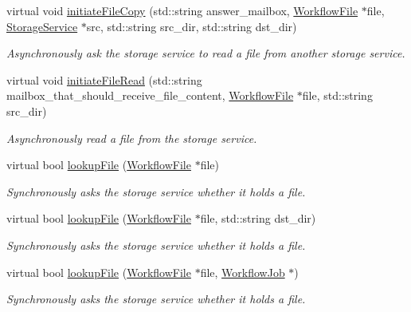 \begin{DoxyCompactItemize}
virtual void \hyperlink{classwrench_1_1_storage_service_a09b05865c81f22295720776e5952ffd4}{initiate\+File\+Copy} (std\+::string answer\+\_\+mailbox, \hyperlink{classwrench_1_1_workflow_file}{Workflow\+File} $\ast$file, \hyperlink{classwrench_1_1_storage_service}{Storage\+Service} $\ast$src, std\+::string src\+\_\+dir, std\+::string dst\+\_\+dir)
\begin{DoxyCompactList}\small\item\em Asynchronously ask the storage service to read a file from another storage service. \end{DoxyCompactList}\item 
virtual void \hyperlink{classwrench_1_1_storage_service_a36f64413afa694b425cf5caad85b4c81}{initiate\+File\+Read} (std\+::string mailbox\+\_\+that\+\_\+should\+\_\+receive\+\_\+file\+\_\+content, \hyperlink{classwrench_1_1_workflow_file}{Workflow\+File} $\ast$file, std\+::string src\+\_\+dir)
\begin{DoxyCompactList}\small\item\em Asynchronously read a file from the storage service. \end{DoxyCompactList}\item 
virtual bool \hyperlink{classwrench_1_1_storage_service_aa0880c02e803fad5f2b467c91b520519}{lookup\+File} (\hyperlink{classwrench_1_1_workflow_file}{Workflow\+File} $\ast$file)
\begin{DoxyCompactList}\small\item\em Synchronously asks the storage service whether it holds a file. \end{DoxyCompactList}\item 
virtual bool \hyperlink{classwrench_1_1_storage_service_a348189474e741dab4893213b5bcca1d1}{lookup\+File} (\hyperlink{classwrench_1_1_workflow_file}{Workflow\+File} $\ast$file, std\+::string dst\+\_\+dir)
\begin{DoxyCompactList}\small\item\em Synchronously asks the storage service whether it holds a file. \end{DoxyCompactList}\item 
virtual bool \hyperlink{classwrench_1_1_storage_service_ac9ab2fe94c4dedec9dbe261206044d6e}{lookup\+File} (\hyperlink{classwrench_1_1_workflow_file}{Workflow\+File} $\ast$file, \hyperlink{classwrench_1_1_workflow_job}{Workflow\+Job} $\ast$)
\begin{DoxyCompactList}\small\item\em Synchronously asks the storage service whether it holds a file. \end{DoxyCompactList}\item 

\end{DoxyCompactItemize}

